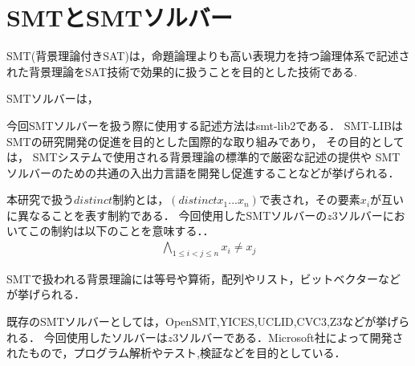 \chapter{SMTとSMTソルバー}\label{chap:smt}

%
%
SMT(背景理論付きSAT)は，命題論理よりも高い表現力を持つ論理体系で記述された背景理論をSAT技術で効果的に扱うことを目的とした技術である.


%
%
SMTソルバーは，


今回SMTソルバーを扱う際に使用する記述方法はsmt-lib2である．
SMT-LIBはSMTの研究開発の促進を目的とした国際的な取り組みであり，
その目的としては，
SMTシステムで使用される背景理論の標準的で厳密な記述の提供や
SMTソルバーのための共通の入出力言語を開発し促進することなどが挙げられる．


本研究で扱う$distinct$制約とは，$(distinct x_1 ... x_n)$で表され，その要素$x_i$が互いに異なることを表す制約である．
今回使用したSMTソルバーの$z3ソルバー$においてこの制約は以下のことを意味する．．
\begin{eqnarray*}
    \bigwedge_{1 \leq i < j \leq n} x_i \neq x_j
\end{eqnarray*}


SMTで扱われる背景理論には等号や算術，配列やリスト，ビットベクターなどが挙げられる．

既存のSMTソルバーとしては，OpenSMT,YICES,UCLID,CVC3,Z3などが挙げられる．
今回使用したソルバーは$z3ソルバー$である．Microsoft社によって開発されたもので，プログラム解析やテスト,検証などを目的としている．



